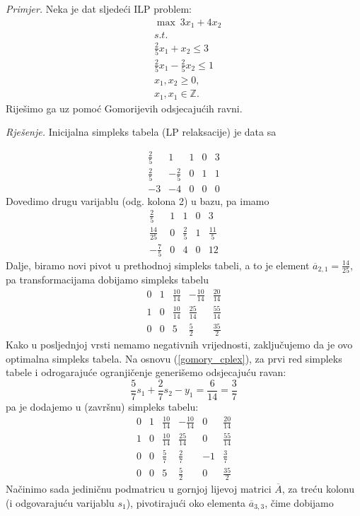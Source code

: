 \documentclass[a4paper, utf8, 11pt, colorlinks]{book}
\begin{document}
\emph{{Primjer.}} Neka je dat sljedeći ILP problem:\\
$$\begin{array}{ll}
    &\max\ 3 x_1 + 4 x_2 \\
    & {s.t. }  \\
    & \frac{2}{5}x_1 + x_2 \leq 3 \\
    &\frac{2}{5}x_1 - \frac{2}{5}x_2 \leq 1 \\
    &x_1, x_2 \geq 0, \\
    &  x_1, x_1 \in \mathbb{Z}.
\end{array}$$
Riješimo ga uz pomoć Gomorijevih odsjecajućih ravni. 

\emph{Rješenje.}
Inicijalna simpleks tabela (LP relaksacije) je data sa 

$$\begin{array}{cccc|c}
   \frac{2}{5}           & 1               & 1 & 0 & 3 \\
   \frac{2}{5}           & -\frac{2}{5}    & 0 & 1 & 1 \\ \hline
   -3                    &  -4             & 0 & 0 & 0
\end{array}$$
Dovedimo drugu varijablu (odg. kolona 2) u bazu, pa imamo 
$$\begin{array}{cccc|c}
   \frac{2}{5}           & 1               & 1           & 0 & 3 \\
   \frac{14}{25}         & 0               & \frac{2}{5} & 1 & \frac{11}{5}\\ \hline
   -\frac{7}{5}                  & 0               &4 & 0 & 12
\end{array}$$
Dalje, biramo novi pivot  u prethodnoj simpleks tabeli, a to je element $\overline{a}_{2,1} = \frac{14}{25}$, pa transformacijama dobijamo simpleks tabelu
$$
\begin{array}{cccc|c}
    0    &  1  &  \frac{10}{14} &  -\frac{10}{14}  &  \frac{20}{14}                  \\
    1    &  0  &  \frac{10}{14} &   \frac{25}{14}  &   \frac{55}{14}\\ \hline
    0    &  0  &  5             &    \frac{5}{2}   &    \frac{35}{2}
\end{array}
$$
Kako u posljednjoj vrsti nemamo negativnih vrijednosti, zaključujemo da je ovo optimalna simpleks tabela. Na osnovu (\ref{gomory_cplex}),   za prvi red simpleks tabele i odrogarajuće ogranjičenje generišemo odsjecajuću ravan:
$$   \frac{5}{7}s_1 + \frac{2}{7} s_2 -      y_1   = \frac{6}{14}=\frac{3}{7}$$
pa je dodajemo u (završnu) simpleks tabelu:
$$
\begin{array}{ccccc|c}
    0    &  1  &  \frac{10}{14} &  -\frac{10}{14}  &  0 & \frac{20}{14}                  \\
    1    &  0  &  \frac{10}{14} &   \frac{25}{14}  &  0 & \frac{55}{14}\\ 
    0    &  0  & \frac{5}{7}    &   \frac{2}{7}    &  -1 & \frac{3}{7}  \\
     \hline 
    0    &  0  &  5             &    \frac{5}{2}   &  0 &    \frac{35}{2}
\end{array}
$$
Načinimo sada jediničnu podmatricu u gornjoj lijevoj matrici $\overline{A}$, za treću kolonu (i odgovarajuću varijablu $s_1$), pivotirajući oko elementa $\overline{a}_{3,3}$, čime dobijamo 
\end{document}
